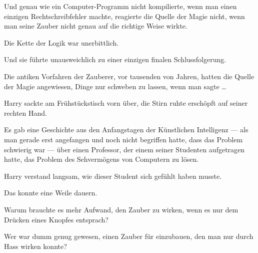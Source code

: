 Und genau wie ein Computer-Programm nicht kompilierte, wenn man einen einzigen Rechtschreibfehler machte, reagierte die Quelle der Magie nicht, wenn man seine Zauber nicht genau auf die richtige Weise wirkte.

Die Kette der Logik war unerbittlich.

Und sie führte unausweichlich zu einer einzigen finalen Schlussfolgerung.

Die antiken Vorfahren der Zauberer, vor tausenden von Jahren, hatten die Quelle der Magie angewiesen, Dinge nur schweben zu lassen, wenn man sagte …


Harry sackte am Frühstückstisch vorn über, die Stirn ruhte erschöpft auf seiner rechten Hand.

Es gab eine Geschichte aus den Anfangstagen der Künstlichen Intelligenz — als man gerade erst angefangen und noch nicht begriffen hatte, dass das Problem schwierig war — über einen Professor, der einem seiner Studenten aufgetragen hatte, das Problem des Sehvermögens von Computern zu lösen.

Harry verstand langsam, wie dieser Student sich gefühlt haben musste.

Das konnte eine Weile dauern.

Warum brauchte es mehr Aufwand, den Zauber  zu wirken, wenn es nur dem Drücken eines Knopfes entsprach?

Wer war dumm genug gewesen, einen Zauber für  einzubauen, den man nur durch Hass wirken konnte?


